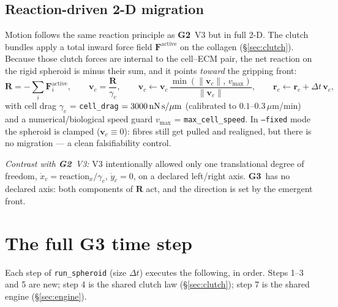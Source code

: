\documentclass[11pt]{article}
\newcommand{\rv}{\mathbf{r}}
\newcommand{\Fv}{\mathbf{F}}
\newcommand{\dt}{\Delta t}
\newcommand{\umt}{\mu\text{m}}            %
\newcommand{\um}{\,\umt}
\newcommand{\GTwo}{\textcolor{g2col}{\textbf{G2}}}
\newcommand{\GThree}{\textcolor{g3col}{\textbf{G3}}}
\newcommand{\code}[1]{\texttt{\small #1}}
\begin{document}
\subsection{Reaction-driven 2-D migration}
\label{sec:motion}

Motion follows the same reaction principle as \GTwo\ V3 but in full 2-D. The clutch bundles apply a
total inward force field $\Fv^{\text{active}}$ on the collagen (\S\ref{sec:clutch}). Because those
clutch forces are internal to the cell--ECM pair, the net reaction on the rigid spheroid is
minus their sum, and it points \emph{toward} the gripping front:
\begin{equation}
  \mathbf R = -\sum_i \Fv_i^{\text{active}},
  \qquad
  \mathbf v_c = \frac{\mathbf R}{\gamma_c},
  \qquad
  \mathbf v_c \leftarrow \mathbf v_c\,\frac{\min(\|\mathbf v_c\|,\,v_{\max})}{\|\mathbf v_c\|},
  \qquad
  \rv_c \leftarrow \rv_c + \dt\,\mathbf v_c,
  \label{eq:motion}
\end{equation}
with cell drag $\gamma_c$ = \code{cell\_drag} $=3000\,\text{nN\,s/}\umt$ (calibrated to
$0.1$--$0.3\um$/min) and a numerical/biological speed guard $v_{\max}$ = \code{max\_cell\_speed}.
In \code{--fixed} mode the spheroid is clamped ($\mathbf v_c\equiv0$): fibres still get pulled and
realigned, but there is no migration --- a clean falsifiability control.

\emph{Contrast with \GTwo\ V3:} V3 intentionally allowed only one translational degree of freedom,
$\dot x_c = \text{reaction}_x/\gamma_c$, $\dot y_c = 0$, on a declared left/right axis. \GThree\ has no
declared axis: both components of $\mathbf R$ act, and the direction is set by the emergent front.

\section{The full G3 time step}
\label{sec:loop}

Each step of \code{run\_spheroid} (size $\dt$) executes the following, in order. Steps 1--3 and 5
are new; step 4 is the shared clutch law (\S\ref{sec:clutch}); step 7 is the shared engine
(\S\ref{sec:engine}).
\end{document}
